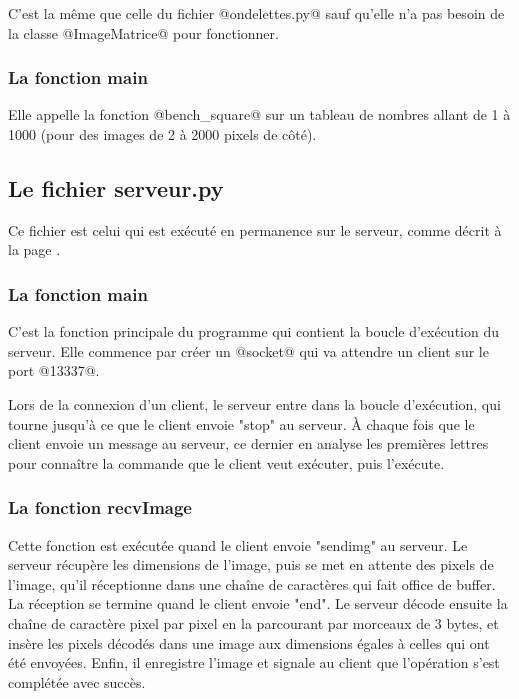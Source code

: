 \documentclass{article}
\begin{document}
C'est la même que celle du fichier @ondelettes.py@ sauf qu'elle n'a pas besoin de la classe @ImageMatrice@ pour fonctionner.

\subsubsection{La fonction main}

Elle appelle la fonction @bench_square@ sur un tableau de nombres allant de 1 à 1000 (pour des images de 2 à 2000 pixels de côté).



\subsection{Le fichier serveur.py}


Ce fichier est celui qui est exécuté en permanence sur le serveur, comme décrit à la page \pageref{net}.

\subsubsection{La fonction main}

C'est la fonction principale du programme qui contient la boucle d'exécution du serveur. Elle commence par créer un @socket@ qui va attendre un client sur le port @13337@.

Lors de la connexion d'un client, le serveur entre dans la boucle d'exécution, qui tourne jusqu'à ce que le client envoie "stop" au serveur. À chaque fois que le client envoie un message au serveur, ce dernier en analyse les premières lettres pour connaître la commande que le client veut exécuter, puis l'exécute.

\subsubsection{La fonction recvImage}

Cette fonction est exécutée quand le client envoie "sendimg" au serveur. Le serveur récupère les dimensions de l'image, puis se met en attente des pixels de l'image, qu'il réceptionne dans une chaîne de caractères qui fait office de buffer. La réception se termine quand le client envoie "end". Le serveur décode ensuite la chaîne de caractère pixel par pixel en la parcourant par morceaux de 3 bytes, et insère les pixels décodés dans une image aux dimensions égales à celles qui ont été envoyées. Enfin, il enregistre l'image et signale au client que l'opération s'est complétée avec succès.
\end{document}

